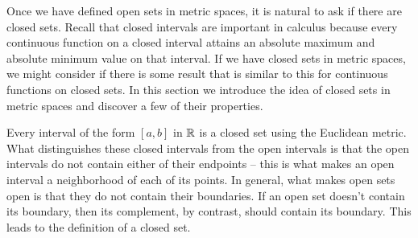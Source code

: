 \label{chap:closed_sets}

\vspace*{-17 pt}

\vspace*{13 pt}

\label{sec_closed_sets_intro}
Once we have defined open sets in metric spaces, it is natural to ask if there are closed sets. Recall that closed intervals are important in calculus because every continuous function on a closed interval attains an absolute maximum and absolute minimum value on that interval. If we have closed sets in metric spaces, we might consider if there is some result that is similar to this for continuous functions on closed sets. In this section we introduce the idea of closed sets in metric spaces and discover a few of their properties. 

Every interval of the form $[a,b]$ in $\mathbb{R}$ is a closed set using the Euclidean metric. What distinguishes these closed intervals from the open intervals is that the open intervals do not contain either of their endpoints -- this is what makes an open interval a neighborhood of each of its points. In general, what makes open sets open is that they do not contain their boundaries. If an open set doesn't contain its boundary, then its complement, by contrast, should contain its boundary. This leads to the definition of a closed set. 

